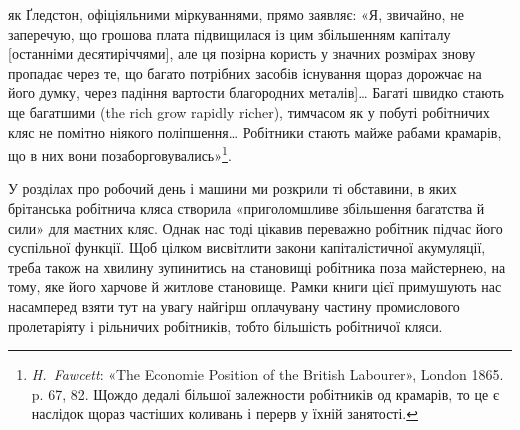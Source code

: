 як Ґледстон, офіціяльними міркуваннями, прямо заявляє:
«Я, звичайно, не заперечую, що грошова плата підвищилася із
цим збільшенням капіталу [останніми десятиріччями], але ця
позірна користь у значних розмірах знову пропадає через те,
що багато потрібних засобів існування щораз дорожчає на його
думку, через падіння вартости благородних металів]\dots{} Багаті
швидко стають ще багатшими (the rich grow rapidly richer),
тимчасом як у побуті робітничих кляс не помітно ніякого поліпшення\dots{}
Робітники стають майже рабами крамарів, що в них
вони позаборговувались»\footnote{
\emph{H.~Fawcett}: «The Economie Position of the British Labourer»,
London 1865. p. 67, 82. Щождо дедалі більшої залежности робітників од
крамарів, то це є наслідок щораз частіших коливань і перерв у їхній
занятості.
}.


У розділах про робочий день і машини ми розкрили ті обставини,
в яких брітанська робітнича кляса створила «приголомшливе
збільшення багатства й сили» для маєтних кляс. Однак
нас тоді цікавив переважно робітник підчас його суспільної
функції. Щоб цілком висвітлити закони капіталістичної акумуляції,
треба також на хвилину зупинитись на становищі робітника
поза майстернею, на тому, яке його харчове й житлове становище.
Рамки книги цієї примушують нас насамперед взяти тут на увагу
найгірш оплачувану частину промислового пролетаріяту і рільничих
робітників, тобто більшість робітничої кляси.
